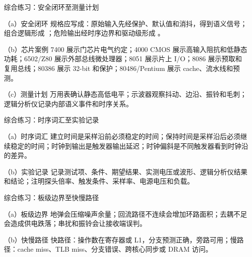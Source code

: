 \begin{chapteranswer}{综合练习：安全闭环至测量计划}
\begin{answersubproblem}{（a）安全闭环}
规格应写成：原始输入先经保护、默认值和消抖，得到语义信号；组合逻辑形成 ；危险输出经时序边界和驱动级形成 。
\end{answersubproblem}
\begin{answersubproblem}{（b）芯片案例}
7400 展示门芯片电气约定；4000 CMOS 展示高输入阻抗和低静态功耗；6502/Z80 展示外部总线微处理器；8051 展示片上 I/O；8086 展示预取和复用总线；80386 展示 32-bit 和保护；80486/Pentium 展示 cache、流水线和预测。
\end{answersubproblem}
\begin{answersubproblem}{（c）测量计划}
万用表确认静态高低电平；示波器观察抖动、边沿、振铃和毛刺；逻辑分析仪记录内部语义事件和时序关系。
\end{answersubproblem}
\end{chapteranswer}

\begin{chapteranswer}{综合练习：时序词汇至实验记录}
\begin{answersubproblem}{（a）时序词汇}
建立时间是采样沿前必须稳定的时间；保持时间是采样沿后必须继续稳定的时间；时钟到输出是触发器输出延迟；时钟偏斜是不同触发器看到时钟沿的差异。
\end{answersubproblem}
\begin{answersubproblem}{（b）实验记录}
记录测试项、条件、期望结果、实测电压或波形、逻辑分析仪结果和结论；注明探头倍率、触发条件、采样率、电源电压和负载。
\end{answersubproblem}
\end{chapteranswer}

\begin{chapteranswer}{综合练习：板级边界至快慢路径}
\begin{answersubproblem}{（a）板级边界}
地弹会压缩噪声余量；回流路径不连续会增加环路面积；去耦不足会造成供电跌落；串扰和振铃会让接收端误判。
\end{answersubproblem}
\begin{answersubproblem}{（b）快慢路径}
快路径：操作数在寄存器或 L1，分支预测正确，旁路可用；慢路径：cache miss、TLB miss、分支错误、跨核心同步或 DRAM 访问。
\end{answersubproblem}
\end{chapteranswer}

